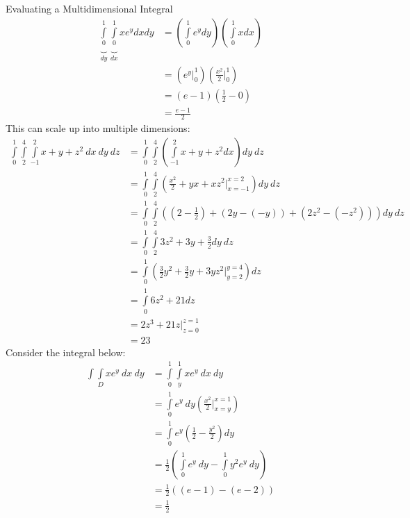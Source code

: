 \documentclass[8pt]{extarticle}
\begin{document}
  \begin{problem}{Evaluating a Multidimensional Integral}
    \begin{align*}
      \underbrace{\int\limits_{0}^{1}}_{dy}\underbrace{\int\limits_{0}^{1}}_{dx}xe^y dx dy &= \left(\int\limits_{0}^{1}e^y dy\right)\left(\int\limits_{0}^{1}x dx\right)\\
                                                                             &= \left(e^y\biggr\vert_{0}^{1}\right)\left(\frac{x^2}{2}\biggr\vert_{0}^{1}\right)\\
                                                                             &= (e-1)\left(\frac{1}{2}-0\right)\\
                                                                             &= \frac{e-1}{2}
    \end{align*}
    This can scale up into multiple dimensions:
    \begin{align*}
      \int\limits_{0}^{1}\int\limits_{2}^{4}\int\limits_{-1}^{2} x+y+z^2~dx~dy~dz &= \int\limits_{0}^{1}\int\limits_{2}^{4}\left(\int\limits_{-1}^{2}x+y+z^2 dx\right)dy~dz\\
                                                             &= \int\limits_{0}^{1}\int\limits_{2}^{4}\left(\frac{x^2}{2}+yx + xz^2 \biggr\vert_{x=-1}^{x=2}\right)dy~dz\\
                                                             &= \int\limits_{0}^{1}\int\limits_{2}^{4}\left(\left(2-\frac{1}{2}\right) + (2y-(-y)) + (2z^2-(-z^2))\right) dy~dz\\
                                                             &= \int\limits_{0}^{1}\int\limits_{2}^{4} 3z^2 + 3y + \frac{3}{2} dy~dz\\
                                                             &= \int\limits_{0}^{1} \left(\frac{3}{2}y^2 + \frac{3}{2}y + 3yz^2\biggr\vert_{y=2}^{y=4}\right)dz\\
                                                             &= \int\limits_{0}^{1} 6z^2+21 dz\\
                                                             &= 2z^3 + 21z\biggr\vert_{z=0}^{z=1} \\
                                                             &= 23
    \end{align*}
    Consider the integral below:
    \begin{align*}
      \int\int\limits_{D}xe^y~dx~dy &= \int\limits_{0}^{1}\int\limits_{y}^{1}xe^y~dx~dy\\
                                    &= \int\limits_{0}^{1}e^y~dy\left(\frac{x^2}{2}\biggr\vert_{x=y}^{x=1}\right)\\
                                    &= \int\limits_{0}^{1}e^y\left(\frac{1}{2} - \frac{y^2}{2}\right)dy\\
                                    &= \frac{1}{2}\left(\int\limits_{0}^{1}e^y~dy - \int\limits_{0}^{1}y^2e^y~dy\right)\\
                                    &= \frac{1}{2}\left((e-1) - (e-2)\right)\\
                                    &= \frac{1}{2}
    \end{align*}
  \end{problem}
\end{document}

